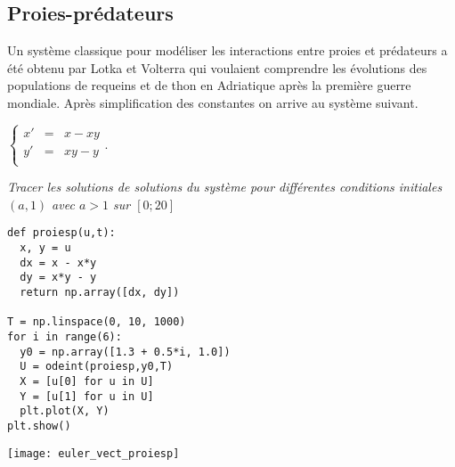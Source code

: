 \subsection{Proies-prédateurs}
\begin{minipage}{0.50\linewidth}
Un système classique pour modéliser les interactions entre proies et prédateurs a été obtenu par Lotka et Volterra qui voulaient comprendre les évolutions des populations de requeins et de thon en Adriatique après la première guerre mondiale. Après simplification des constantes on arrive au système suivant.

$\displaystyle \left\{\begin{matrix}x'&=&x-xy\\ y' &=& xy - y\\\end{matrix}\right.$.

\begin{Exercise}\it 
Tracer les solutions de solutions du système pour différentes conditions initiales $(a,1)$ avec $a> 1$ sur $[0; 20]$
\end{Exercise}
\begin{Answer}
\begin{lstlisting}
def proiesp(u,t):
  x, y = u
  dx = x - x*y
  dy = x*y - y
  return np.array([dx, dy])

T = np.linspace(0, 10, 1000)
for i in range(6):
  y0 = np.array([1.3 + 0.5*i, 1.0])
  U = odeint(proiesp,y0,T)
  X = [u[0] for u in U]
  Y = [u[1] for u in U]
  plt.plot(X, Y)
plt.show()
\end{lstlisting}
\end{Answer}
\end{minipage}
\begin{minipage}{0.45\linewidth}
\begin{center}
\texttt{[image: euler\_vect\_proiesp]}    
\end{center}
\end{minipage}
